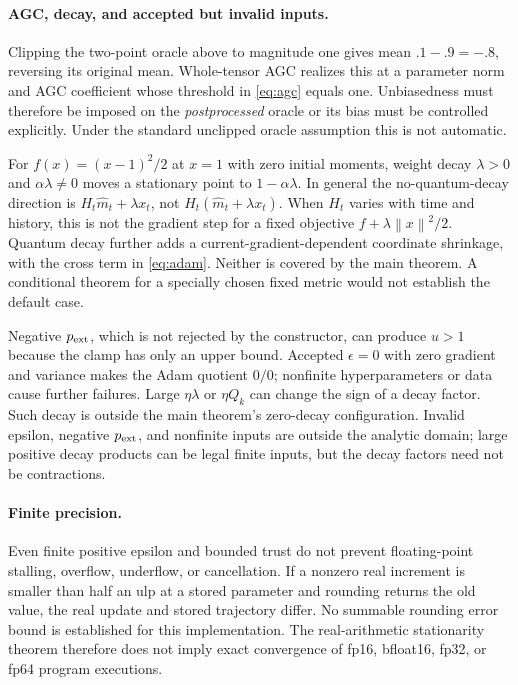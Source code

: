 \documentclass[11pt,a4paper]{article}
\theoremstyle{definition}
\theoremstyle{remark}
\newcommand{\norm}[1]{\left\lVert#1\right\rVert}
\begin{document}
\paragraph{AGC, decay, and accepted but invalid inputs.}
Clipping the two-point oracle above to magnitude one gives mean $.1-.9=-.8$,
reversing its original mean. Whole-tensor AGC realizes this at a parameter
norm and AGC coefficient whose threshold in \eqref{eq:agc} equals one.
Unbiasedness must therefore be imposed on the \emph{postprocessed} oracle or
its bias must be controlled explicitly. Under the standard unclipped oracle
assumption this is not automatic.

For $f(x)=(x-1)^2/2$ at $x=1$ with zero initial moments, weight decay
$\lambda>0$ and $\alpha\lambda\ne0$ moves a stationary point to
$1-\alpha\lambda$. In general the no-quantum-decay direction is
$H_t\widehat m_t+\lambda x_t$, not $H_t(\widehat m_t+\lambda x_t)$.
When $H_t$ varies with time and history, this is not the gradient step for a
fixed objective $f+\lambda\norm{x}^2/2$. Quantum decay further adds a
current-gradient-dependent coordinate shrinkage, with the cross term in
\eqref{eq:adam}. Neither is covered by the main theorem. A conditional theorem
for a specially chosen fixed metric would not establish the default case.

Negative $p_{\rm ext}$, which is not rejected by the constructor, can produce
$u>1$ because the clamp has only an upper bound. Accepted $\epsilon=0$ with
zero gradient and variance makes the Adam quotient $0/0$; nonfinite
hyperparameters or data cause further failures. Large $\eta\lambda$ or
$\eta Q_k$ can change the sign of a decay factor. Such decay is outside the
main theorem's zero-decay configuration. Invalid epsilon, negative
$p_{\rm ext}$, and nonfinite inputs are outside the analytic domain;
large positive decay products can be legal finite inputs, but the decay
factors need not be contractions.

\paragraph{Finite precision.}
Even finite positive epsilon and bounded trust do not prevent floating-point
stalling, overflow, underflow, or cancellation. If a nonzero real increment
is smaller than half an ulp at a stored parameter and rounding returns the
old value, the real update and stored trajectory differ. No summable rounding
error bound is established for this implementation. The real-arithmetic
stationarity theorem therefore does not imply exact convergence of fp16,
bfloat16, fp32, or fp64 program executions.
\end{document}

